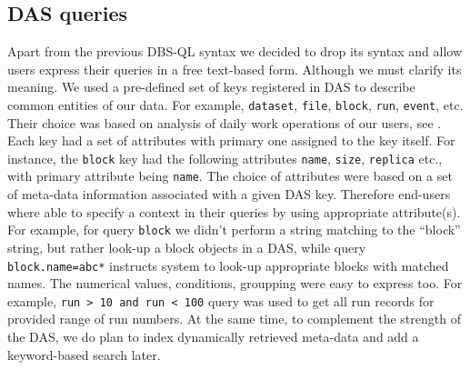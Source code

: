\documentclass[1p,times]{elsarticle}
\begin{document}


\subsection{DAS queries}
Apart from the previous DBS-QL syntax we decided to drop its syntax and allow users
express their queries in a free text-based form. Although we must clarify its
meaning. We used a pre-defined set of keys registered in DAS to describe common
entities of our data. For example, \verb+dataset+, 
\verb+file+, \verb+block+, \verb+run+, \verb+event+, etc. Their choice
was based on analysis of daily work operations of our users, see \cite{DBS07}.
Each key had a set of attributes with primary one assigned to the key itself.
For instance, the \verb+block+ key had the following attributes
\verb+name+, \verb+size+, \verb+replica+ etc., 
with primary attribute being \verb+name+.
The choice of attributes were based on a set of meta-data information
associated with a given DAS key. Therefore end-users where able to specify
a context in their queries by using appropriate attribute(s). For example,
for query \verb+block+ we didn't perform a string matching to the
``block'' string, but rather look-up a block objects in a DAS, while query
\verb+block.name=abc*+ instructs system to look-up appropriate blocks
with matched names. The numerical values, conditions, groupping were
easy to express too. For example, \verb+run > 10 and run < 100+ query 
was used to get all run records for provided range of run numbers. 
At the same time, to complement the strength of the 
DAS, we do plan to index dynamically retrieved meta-data and add a keyword-based 
search later.
\end{document}
